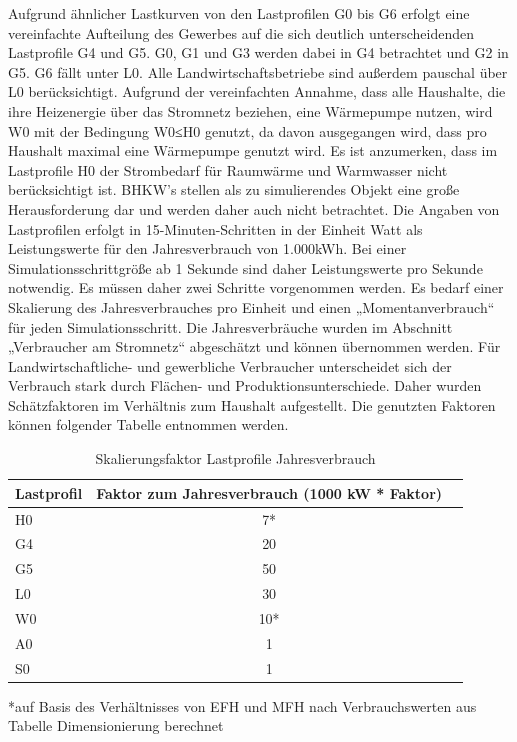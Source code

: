 Aufgrund ähnlicher Lastkurven von den Lastprofilen G0 bis G6 erfolgt eine vereinfachte Aufteilung des Gewerbes auf die sich deutlich unterscheidenden Lastprofile G4 und G5.
G0, G1 und G3 werden dabei in G4 betrachtet und G2 in G5. 
G6 fällt unter L0. 
Alle Landwirtschaftsbetriebe sind außerdem pauschal über L0 berücksichtigt. 
Aufgrund der vereinfachten Annahme, dass alle Haushalte, die ihre Heizenergie über das Stromnetz beziehen, eine Wärmepumpe nutzen, wird W0 mit der Bedingung W0≤H0 genutzt, da davon ausgegangen wird, dass pro Haushalt maximal eine Wärmepumpe genutzt wird. 
Es ist anzumerken, dass im Lastprofile H0 der Strombedarf für Raumwärme und Warmwasser nicht berücksichtigt ist. 
BHKW’s stellen als zu simulierendes Objekt eine große Herausforderung dar und werden daher auch nicht betrachtet.
Die Angaben von Lastprofilen erfolgt in 15-Minuten-Schritten in der Einheit Watt als Leistungswerte für den Jahresverbrauch von 1.000kWh. 
Bei einer Simulationsschrittgröße ab 1 Sekunde sind daher Leistungswerte pro Sekunde notwendig. 
Es müssen daher zwei Schritte vorgenommen werden. 
Es bedarf einer Skalierung des Jahresverbrauches pro Einheit und einen „Momentanverbrauch“ für jeden Simulationsschritt.
Die Jahresverbräuche wurden im Abschnitt „Verbraucher am Stromnetz“ abgeschätzt und können übernommen werden. 
Für Landwirtschaftliche- und gewerbliche Verbraucher unterscheidet sich der Verbrauch stark durch Flächen- und Produktionsunterschiede. 
Daher wurden Schätzfaktoren im Verhältnis zum Haushalt aufgestellt. Die genutzten Faktoren können folgender Tabelle entnommen werden.

\begin{table}[htbp]
    \centering
    \caption{Skalierungsfaktor Lastprofile Jahresverbrauch}
    \label{tab:skalierungsfaktor}
    \begin{tabular}{lcl}
        \toprule
        \textbf{Lastprofil} & \textbf{Faktor zum Jahresverbrauch (1000 kW * Faktor)} \\
        \midrule
        H0 & 7* \\
        G4 & 20 \\
        G5 & 50 \\
        L0 & 30 \\
        W0 & 10*\\
        A0 & 1 \\
        S0 & 1 \\
        \bottomrule
    \end{tabular}
\end{table}
*auf Basis des Verhältnisses von EFH und MFH nach Verbrauchswerten aus Tabelle Dimensionierung berechnet
    
